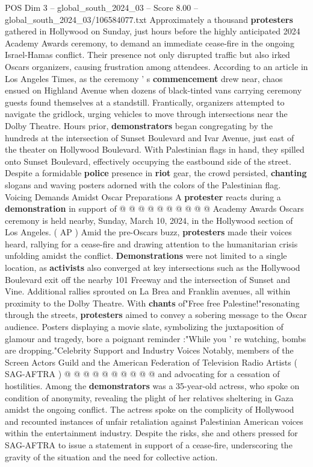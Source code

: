 \begin{textsample}{POS Dim 3 – global\_south\_2024\_03 – Score 8.00 – global\_south\_2024\_03/106584077.txt}  \label{ex:f3_pos_422}
Approximately a thousand \textbf{protesters} gathered in Hollywood on Sunday, just hours before the highly anticipated 2024 Academy Awards ceremony, to demand an immediate cease-fire in the ongoing Israel-Hamas conflict.
Their presence not only disrupted traffic but also irked Oscars organizers, causing frustration among attendees.
According to an article in Los Angeles Times, as the ceremony ' s \textbf{commencement} drew near, chaos ensued on Highland Avenue when dozens of black-tinted vans carrying ceremony guests found themselves at a standstill.
Frantically, organizers attempted to navigate the gridlock, urging vehicles to move through intersections near the Dolby Theatre.
Hours prior, \textbf{demonstrators} began congregating by the hundreds at the intersection of Sunset Boulevard and Ivar Avenue, just east of the theater on Hollywood Boulevard.
With Palestinian flags in hand, they spilled onto Sunset Boulevard, effectively occupying the eastbound side of the street.
Despite a formidable \textbf{police} presence in \textbf{riot} gear, the crowd persisted, \textbf{chanting} slogans and waving posters adorned with the colors of the Palestinian flag.
Voicing Demands Amidst Oscar Preparations A \textbf{protester} reacts during a \textbf{demonstration} in support of @ @ @ @ @ @ @ @ @ @ Academy Awards Oscars ceremony is held nearby, Sunday, March 10, 2024, in the Hollywood section of Los Angeles. ( AP ) Amid the pre-Oscars buzz, \textbf{protesters} made their voices heard, rallying for a cease-fire and drawing attention to the humanitarian crisis unfolding amidst the conflict. \textbf{Demonstrations} were not limited to a single location, as \textbf{activists} also converged at key intersections such as the Hollywood Boulevard exit off the nearby 101 Freeway and the intersection of Sunset and Vine.
Additional rallies sprouted on La Brea and Franklin avenues, all within proximity to the Dolby Theatre.
With \textbf{chants} of"Free free Palestine!"resonating through the streets, \textbf{protesters} aimed to convey a sobering message to the Oscar audience.
Posters displaying a movie slate, symbolizing the juxtaposition of glamour and tragedy, bore a poignant reminder :"While you ' re watching, bombs are dropping."Celebrity Support and Industry Voices Notably, members of the Screen Actors Guild and the American Federation of Television Radio Artists ( SAG-AFTRA ) @ @ @ @ @ @ @ @ @ @ and advocating for a cessation of hostilities.
Among the \textbf{demonstrators} was a 35-year-old actress, who spoke on condition of anonymity, revealing the plight of her relatives sheltering in Gaza amidst the ongoing conflict.
The actress spoke on the complicity of Hollywood and recounted instances of unfair retaliation against Palestinian American voices within the entertainment industry.
Despite the risks, she and others pressed for SAG-AFTRA to issue a statement in support of a cease-fire, underscoring the gravity of the situation and the need for collective action.

\end{textsample}
